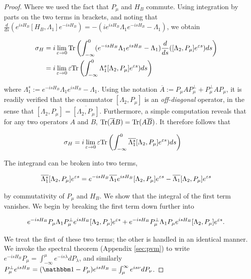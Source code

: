\documentclass[12pt, letterpaper]{article}
\begin{document}
\begin{proof}
Where we used the fact that $P_\mu$ and $H_B$ commute. Using integration by parts on the two terms in brackets, and noting that $\frac{d}{ds}(e^{isH_B}[H_B,\Lambda_1] e^{-isH_B}) = -(ie^{isH_B}\Lambda_1 e^{-isH_B} - \Lambda_1)$, we obtain

\[\begin{aligned}
\sigma_H &= i \lim_{\varepsilon\to 0}\text{Tr} \left( \int_{-\infty}^0 (e^{-isH_B}\Lambda_1e^{isH_B} - \Lambda_1)\frac{d}{ds}([\Lambda_2, P_\mu] e^{\varepsilon s})ds\right)\\
&= i \lim_{\varepsilon\to 0}\varepsilon \text{Tr} \left( \int_{-\infty}^0 \Lambda_1^s[\Lambda_2, P_\mu] e^{\varepsilon s})ds\right)\\
\end{aligned}\]

where $\Lambda_1^s := e^{-isH_B}\Lambda_1e^{isH_B} - \Lambda_1$. Using the notation $\overline{A} := P_\mu AP_\mu^\perp + P_\mu^\perp A P_\mu$, it is readily verified that the commutator $[\Lambda_2, P_\mu]$ is an \textit{off-diagonal} operator, in the sense that  $[\Lambda_2, P_\mu] = \overline{[\Lambda_2,P_\mu]}$. Furthermore, a simple computation reveals that for any two operators $A$ and $B$, $\text{Tr}(\overline{A}B) = \text{Tr}(A\overline{B})$. It therefore follows that

\[\begin{aligned}
\sigma_H &= i \lim_{\varepsilon\to 0}\varepsilon \text{Tr} \left( \int_{-\infty}^0 \overline{\Lambda_1^s}[\Lambda_2, P_\mu] e^{\varepsilon s})ds\right)
\end{aligned}\]

The integrand can be broken into two terms, 

\[\overline{\Lambda_1^s}[\Lambda_2, P_\mu] e^{\varepsilon s} = e^{-isH_B}\overline{\Lambda_1}e^{isH_B}[\Lambda_2, P_\mu]e^{\varepsilon s} - \overline{\Lambda_1}[\Lambda_2, P_\mu]e^{\varepsilon s}\]

by commutativity of $P_\mu$ and $H_B$. We show that the integral of the first term vanishes. We begin by breaking the first term down further into

\[e^{-isH_B}P_\mu \Lambda_1 P_\mu^\perp e^{isH_B}[\Lambda_2, P_\mu]e^{\varepsilon s} + e^{-isH_B}P_\mu^\perp \Lambda_1 P_\mu e^{isH_B}[\Lambda_2, P_\mu]e^{\varepsilon s}.\]

We treat the first of these two terms; the other is handled in an identical manner. We invoke the spectral theorem (Appendix \ref{sec:pvm}) to write $e^{-isH_B}P_\mu = \int_{-\infty}^\mu e^{-is\lambda}dP_\lambda$, and similarly $P_\mu^\perp e^{isH_B} = (\One- P_\mu) e^{isH_B} = \int_\mu^\infty e^{is\nu} dP_\nu$. 


\end{proof}
\end{document}
